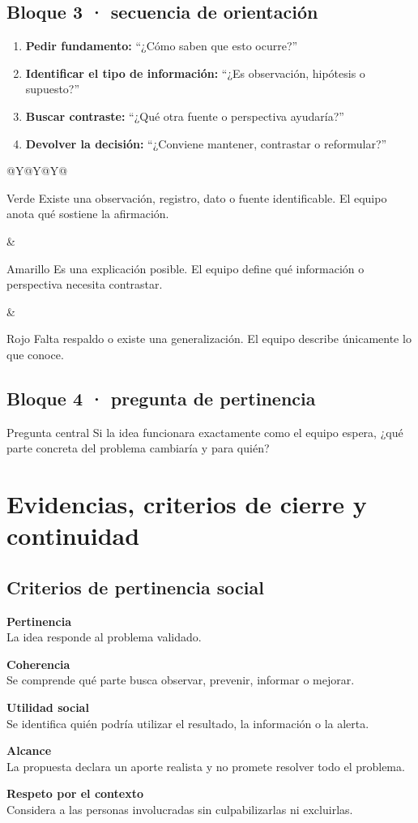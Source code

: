 \documentclass[10pt,a4paper]{article}
\newcommand{\criterion}[3]{%
  \begin{tcolorbox}[colback=#3!7,colframe=#3,boxrule=0.5pt,arc=1mm,left=2mm,right=2mm,top=1.6mm,bottom=1.6mm,before skip=2pt,after skip=2pt]
  {\bfseries\textcolor{AIEPNavy}{#1}}\\[-1pt]
  {\small #2}
  \end{tcolorbox}
}
\begin{document}
\subsection{Bloque 3 · secuencia de orientación}
\begin{enumerate}
  \item \textbf{Pedir fundamento:} ``¿Cómo saben que esto ocurre?''
  \item \textbf{Identificar el tipo de información:} ``¿Es observación, hipótesis o supuesto?''
  \item \textbf{Buscar contraste:} ``¿Qué otra fuente o perspectiva ayudaría?''
  \item \textbf{Devolver la decisión:} ``¿Conviene mantener, contrastar o reformular?''
\end{enumerate}

\begin{tabularx}{\textwidth}{@{}Y@{\hspace{4mm}}Y@{\hspace{4mm}}Y@{}}
\begin{docbox}[height=41mm]{Verde}
Existe una observación, registro, dato o fuente identificable. El equipo anota qué sostiene la afirmación.
\end{docbox}
&
\begin{docbox}[height=41mm]{Amarillo}
Es una explicación posible. El equipo define qué información o perspectiva necesita contrastar.
\end{docbox}
&
\begin{docbox}[height=41mm]{Rojo}
Falta respaldo o existe una generalización. El equipo describe únicamente lo que conoce.
\end{docbox}
\end{tabularx}

\subsection{Bloque 4 · pregunta de pertinencia}
\begin{navybox}{Pregunta central}
Si la idea funcionara exactamente como el equipo espera, ¿qué parte concreta del problema cambiaría y para quién?
\end{navybox}

\newpage
\section{Evidencias, criterios de cierre y continuidad}

\subsection{Criterios de pertinencia social}
\criterion{Pertinencia}{La idea responde al problema validado.}{AIEPRed}
\criterion{Coherencia}{Se comprende qué parte busca observar, prevenir, informar o mejorar.}{AIEPCyan}
\criterion{Utilidad social}{Se identifica quién podría utilizar el resultado, la información o la alerta.}{AIEPGold}
\criterion{Alcance}{La propuesta declara un aporte realista y no promete resolver todo el problema.}{AIEPGreen}
\criterion{Respeto por el contexto}{Considera a las personas involucradas sin culpabilizarlas ni excluirlas.}{AIEPRed}
\end{document}
